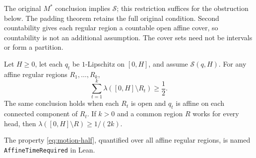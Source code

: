 The original $M^*$ conclusion implies $\mathcal S$; this restriction suffices
for the obstruction below.  The padding theorem retains the full original
condition.  Second countability gives each regular region a countable open
affine cover, so countability is not an additional assumption.  The cover
sets need not be intervals or form a partition.

\begin{theorem}
\label{thm:motion-affine-time}
Let $H\ge0$, let each $q_t$ be $1$-Lipschitz on $[0,H]$, and assume
$\mathcal S(q,H)$.  For any affine regular regions $R_1,\ldots,R_k$,
\begin{equation}
\label{eq:motion-half}
  \sum_{t=1}^k\lambda([0,H]\setminus R_t)\ge\frac12.
\end{equation}
The same conclusion holds when each $R_t$ is open and $q_t$ is affine on each
connected component of $R_t$.  If $k>0$ and a common region $R$ works for every
head, then $\lambda([0,H]\setminus R)\ge1/(2k)$.
\end{theorem}

The property \eqref{eq:motion-half}, quantified over all affine regular
regions, is named \texttt{AffineTimeRequired} in Lean.

